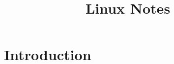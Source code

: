 \documentclass[twocolumn]{IEEEtran} %
\begin{document}
\title{Linux Notes}
\maketitle

\newcommand{\beq}{\begin{equation}}
\newcommand{\eeq}{\end{equation}}
\newcommand{\bi}{\begin{itemize}}
\newcommand{\ei}{\end{itemize}}


\tableofcontents

\section{Introduction}
\end{document}
